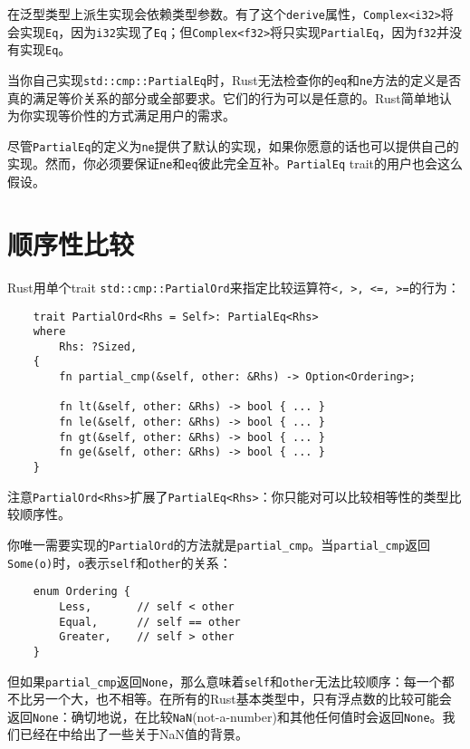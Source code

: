 在泛型类型上派生实现会依赖类型参数。有了这个\texttt{derive}属性，\texttt{Complex<i32>}将会实现\texttt{Eq}，因为\texttt{i32}实现了\texttt{Eq}；但\texttt{Complex<f32>}将只实现\texttt{PartialEq}，因为\texttt{f32}并没有实现\texttt{Eq}。

当你自己实现\texttt{std::cmp::PartialEq}时，Rust无法检查你的\texttt{eq}和\texttt{ne}方法的定义是否真的满足等价关系的部分或全部要求。它们的行为可以是任意的。Rust简单地认为你实现等价性的方式满足用户的需求。

尽管\texttt{PartialEq}的定义为\texttt{ne}提供了默认的实现，如果你愿意的话也可以提供自己的实现。然而，你必须要保证\texttt{ne}和\texttt{eq}彼此完全互补。\texttt{PartialEq} trait的用户也会这么假设。

\section{顺序性比较}\label{cmp}

Rust用单个trait \texttt{std::cmp::PartialOrd}来指定比较运算符\texttt{<, >, <=, >=}的行为：
\begin{verbatim}
    trait PartialOrd<Rhs = Self>: PartialEq<Rhs>
    where
        Rhs: ?Sized,
    {
        fn partial_cmp(&self, other: &Rhs) -> Option<Ordering>;

        fn lt(&self, other: &Rhs) -> bool { ... }
        fn le(&self, other: &Rhs) -> bool { ... }
        fn gt(&self, other: &Rhs) -> bool { ... }
        fn ge(&self, other: &Rhs) -> bool { ... }
    }
\end{verbatim}

注意\texttt{PartialOrd<Rhs>}扩展了\texttt{PartialEq<Rhs>}：你只能对可以比较相等性的类型比较顺序性。

你唯一需要实现的\texttt{PartialOrd}的方法就是\texttt{partial\_cmp}。当\texttt{partial\_cmp}返回\texttt{Some(o)}时，\texttt{o}表示\texttt{self}和\texttt{other}的关系：
\begin{verbatim}
    enum Ordering {
        Less,       // self < other
        Equal,      // self == other
        Greater,    // self > other
    }
\end{verbatim}

但如果\texttt{partial\_cmp}返回\texttt{None}，那么意味着\texttt{self}和\texttt{other}无法比较顺序：每一个都不比另一个大，也不相等。在所有的Rust基本类型中，只有浮点数的比较可能会返回\texttt{None}：确切地说，在比较\texttt{NaN}(not-a-number)和其他任何值时会返回\texttt{None}。我们已经在中给出了一些关于NaN值的背景。

